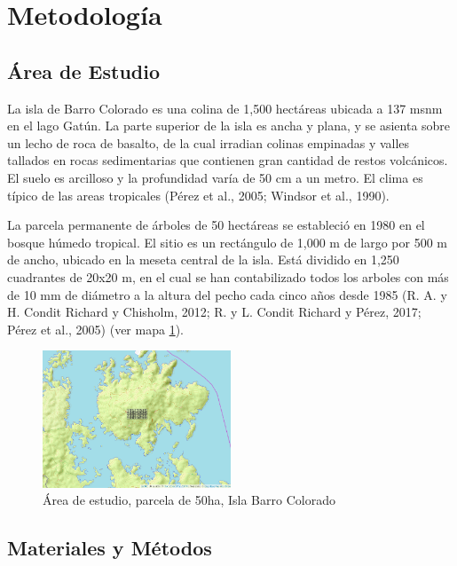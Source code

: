 \documentclass[11pt,]{article}
\begin{document}
\section{Metodología}\label{metodologuxeda}

\subsection{Área de Estudio}\label{uxe1rea-de-estudio}

La isla de Barro Colorado es una colina de 1,500 hectáreas ubicada a 137
msnm en el lago Gatún. La parte superior de la isla es ancha y plana, y
se asienta sobre un lecho de roca de basalto, de la cual irradian
colinas empinadas y valles tallados en rocas sedimentarias que contienen
gran cantidad de restos volcánicos. El suelo es arcilloso y la
profundidad varía de 50 cm a un metro. El clima es típico de las areas
tropicales (Pérez et al., 2005; Windsor et al., 1990).

La parcela permanente de árboles de 50 hectáreas se estableció en 1980
en el bosque húmedo tropical. El sitio es un rectángulo de 1,000 m de
largo por 500 m de ancho, ubicado en la meseta central de la isla. Está
dividido en 1,250 cuadrantes de 20x20 m, en el cual se han contabilizado
todos los arboles con más de 10 mm de diámetro a la altura del pecho
cada cinco años desde 1985 (R. A. y H. Condit Richard y Chisholm, 2012;
R. y L. Condit Richard y Pérez, 2017; Pérez et al., 2005) (ver mapa
\ref{fig:Mapa}).

\begin{figure}
\centering
\includegraphics[width=0.50000\textwidth]{Mapa .png}
\caption{Área de estudio, parcela de 50ha, Isla Barro Colorado
\label{fig:Mapa}}
\end{figure}

\subsection{Materiales y Métodos}\label{materiales-y-muxe9todos}
\end{document}

